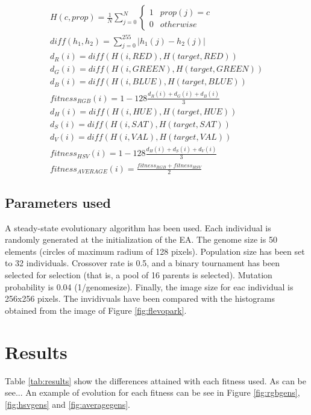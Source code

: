 \documentclass[conference]{IEEEtran}
\begin{document}
\begin{eqnarray}
	\label{eq:fitness}
	H(c, prop) = \frac{1}{N}\sum_{j=0}^N \left\{\begin{matrix}
1 & prop(j) = c\\ 
0 & otherwise
\end{matrix}\right. \\
	diff(h_1, h_2) = \sum_{j=0}^{255} |h_1(j) - h_2(j)| \\
	d_R(i) = diff(H(i, RED), H(target, RED))\\
	d_G(i) = diff(H(i, GREEN), H(target, GREEN))\\
	d_B(i) =  diff(H(i, BLUE), H(target, BLUE))\\
	fitness_{RGB}(i) = 1 - 128\frac{d_R(i) + d_G(i) + d_B(i)}{3} \\
	d_H(i) = diff(H(i, HUE), H(target, HUE))\\
	d_S(i) = diff(H(i, SAT), H(target, SAT))\\
	d_V(i) =  diff(H(i, VAL), H(target, VAL))\\
	fitness_{HSV}(i) = 1 - 128\frac{d_H(i) + d_S(i) + d_V(i)}{3}\\	
	fitness_{AVERAGE}(i) = \frac{fitness_{RGB}+fitness_{HSV}}{2}
\end{eqnarray}





\subsection{Parameters used}

A steady-state evolutionary algorithm has been used. Each individual is randomly generated at the initialization of the EA. The genome size is 50 elements (circles of maximum radium of 128 pixels). Population size has been set to 32 individuals. Crossover rate is 0.5, and a binary tournament has been selected for selection (that is, a pool of 16 parents is selected). Mutation probability is 0.04 (1/genomesize). Finally, the image size for eac individual is 256x256 pixels. The invidivuals have been compared with the histograms obtained from the image of Figure \ref{fig:flevopark}.

\section{Results} 
\label{sec:results}

Table \ref{tab:results} show the differences attained with each fitness used. As can be see... An example of evolution for each fitness can be see in Figure \ref{fig:rgbgens}, \ref{fig:hsvgens} and \ref{fig:averagegens}. 
\end{document}

